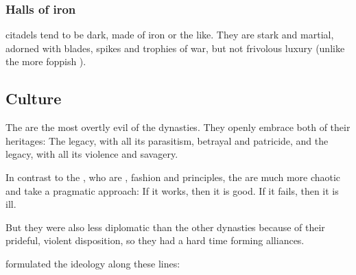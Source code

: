 \subsubsection{Halls of iron}
\Mystraacht{} citadels tend to be dark, made of iron or the like. 
They are stark and martial, adorned with blades, spikes and trophies of war, but not frivolous luxury (unlike the more foppish \KiriathSepher). 








\subsection{Culture}
The \Mystraacht{} are the most overtly evil of the \resphan{} dynasties. 
They openly embrace both of their heritages: 
The \SitraAchra legacy, with all its parasitism, betrayal and patricide, and the \chaotic{} legacy, with all its violence and savagery. 

In contrast to the \KiriathSepher, who are , fashion and principles, the \Mystraacht{} are much more chaotic and take a pragmatic approach: 
If it works, then it is good. 
If it fails, then it is ill. 

But they were also less diplomatic than the other dynasties because of their prideful, violent disposition, so they had a hard time forming alliances. 

 formulated the \Mystraacht{} ideology along these lines: 


